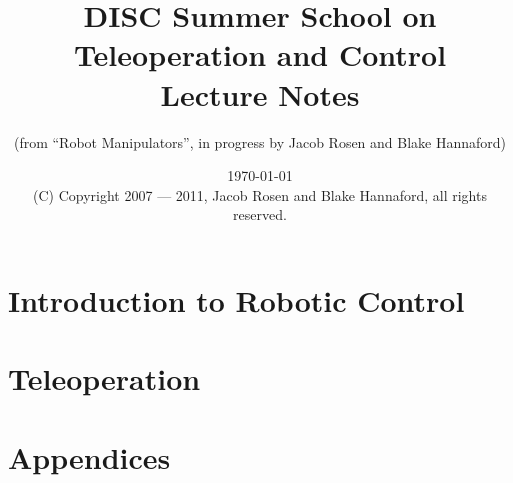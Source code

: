 \documentclass[letterpaper]{book}
\begin{document}
\frontmatter

\title{DISC Summer School on Teleoperation and Control\\Lecture Notes}

\author{(from ``Robot Manipulators'', in progress by Jacob Rosen and Blake Hannaford)}

\date{\today\\(C) Copyright 2007 --- 2011, Jacob Rosen and Blake Hannaford, all rights reserved. }

\maketitle

\tableofcontents

\mainmatter

 \part{Introduction to Robotic Control}

  \part{Teleoperation}
% 
 \part{Appendices}
 \appendix
% 
 

\backmatter
%
\label{LastPage}
\end{document}
